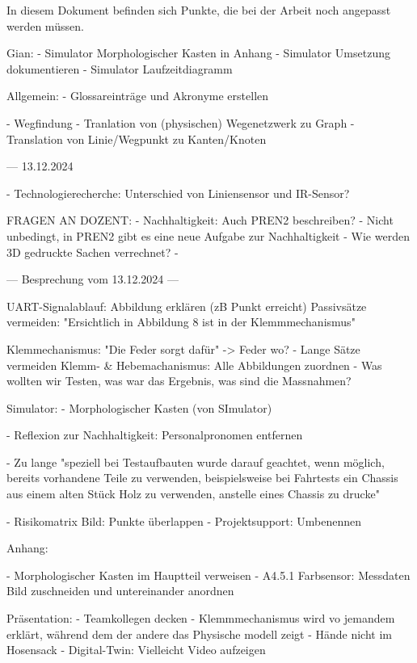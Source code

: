 
In diesem Dokument befinden sich Punkte, die bei der Arbeit noch angepasst werden müssen.

Gian:
- Simulator Morphologischer Kasten in Anhang
- Simulator Umsetzung dokumentieren
- Simulator Laufzeitdiagramm

Allgemein:
- Glossareinträge und Akronyme erstellen

- Wegfindung
  - Tranlation von (physischen) Wegenetzwerk zu Graph
  - Translation von Linie/Wegpunkt zu Kanten/Knoten


--- 13.12.2024

- Technologierecherche: Unterschied von Liniensensor und IR-Sensor?




FRAGEN AN DOZENT:
- Nachhaltigkeit: Auch PREN2 beschreiben?
  - Nicht unbedingt, in PREN2 gibt es eine neue Aufgabe zur Nachhaltigkeit
- Wie werden 3D gedruckte Sachen verrechnet?
  - 


--- Besprechung vom 13.12.2024 ---

UART-Signalablauf: Abbildung erklären (zB Punkt erreicht)
Passivsätze vermeiden: "Ersichtlich in Abbildung 8 ist in der Klemmmechanismus"

Klemmechanismus: "Die Feder  sorgt dafür" -> Feder wo?
- Lange Sätze vermeiden
Klemm- \& Hebemachanismus: Alle Abbildungen zuordnen
- Was wollten wir Testen, was  war das Ergebnis, was sind die Massnahmen?

Simulator:
- Morphologischer Kasten (von SImulator)



- Reflexion zur Nachhaltigkeit: Personalpronomen entfernen

- Zu lange "speziell bei Testaufbauten wurde darauf geachtet, wenn möglich, bereits
vorhandene Teile zu verwenden, beispielsweise bei Fahrtests ein Chassis aus einem alten Stück Holz zu verwenden, anstelle eines Chassis zu drucke"

- Risikomatrix Bild: Punkte überlappen
- Projektsupport: Umbenennen

Anhang:

- Morphologischer Kasten im Hauptteil verweisen
- A4.5.1 Farbsensor: Messdaten Bild zuschneiden und untereinander anordnen


Präsentation:
- Teamkollegen decken
- Klemmmechanismus wird vo jemandem erklärt, während dem der andere das Physische modell zeigt
- Hände nicht im Hosensack
- Digital-Twin: Vielleicht Video aufzeigen



